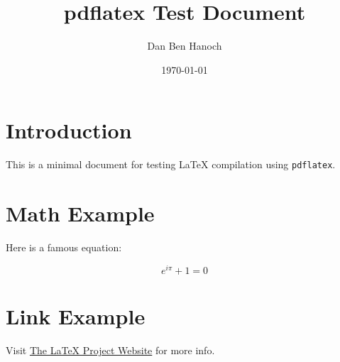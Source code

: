 \documentclass{article}
\title{pdflatex Test Document}
\author{Dan Ben Hanoch}
\date{\today}
\begin{document}
\maketitle

\section{Introduction}

This is a minimal document for testing \LaTeX{} compilation using \texttt{pdflatex}.

\section{Math Example}

Here is a famous equation:

\[
e^{i\pi} + 1 = 0
\]

\section{Link Example}

Visit \href{https://www.latex-project.org/}{The LaTeX Project Website} for more info.
\end{document}
